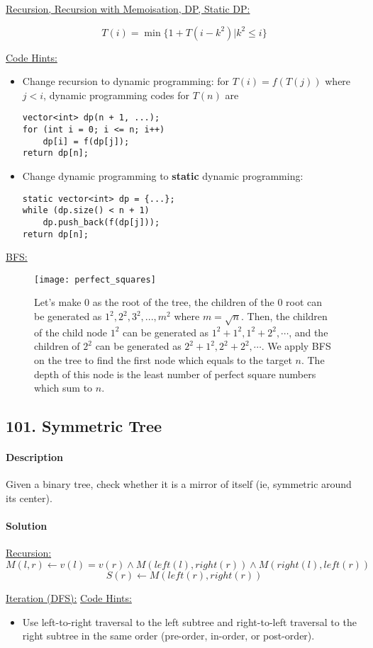 \underline{Recursion, Recursion with Memoisation, DP, Static DP:}

$$T(i)=\min\{1+T(i - k^2)|k^2\leqslant i\}$$

\underline{Code Hints:}
\begin{itemize}
    \item Change recursion to dynamic programming: for $T(i)=f(T(j))$ where $j < i$, dynamic programming codes for $T(n)$ are
\begin{verbatim}
vector<int> dp(n + 1, ...);
for (int i = 0; i <= n; i++)
    dp[i] = f(dp[j]);
return dp[n];
\end{verbatim}
    \item Change dynamic programming to \textbf{static} dynamic programming:
\begin{verbatim}
static vector<int> dp = {...};
while (dp.size() < n + 1)
    dp.push_back(f(dp[j]));
return dp[n];
\end{verbatim}
\end{itemize}

\underline{BFS:}
\begin{figure}[ht]
    \centering
    \texttt{[image: perfect\_squares]}
    \caption{Let's make $0$ as the root of the tree, the children of the $0$ root can be generated as $1^2,2^2,3^2,...,m^2$ where $m=\sqrt{n}$. Then, the children of the child node $1^2$ can be generated as $1^2+1^2,1^2+2^2,\cdots$, and the children of $2^2$ can be generated as $2^2+1^2,2^2+2^2,\cdots$. We apply BFS on the tree to find the first node which equals to the target $n$. The depth of this node is the least number of perfect square numbers which sum to $n$.}
    \label{fig:perfect_squares}
\end{figure}


\subsection{101. Symmetric Tree}

\paragraph{\color{white} \colorbox{Mahogany}{Description}}
Given a binary tree, check whether it is a mirror of itself (ie, symmetric around its center).

\paragraph{\color{white} \colorbox{OliveGreen}{Solution}}
\underline{Recursion:}
$$M(l, r)\gets v(l)=v(r)\wedge M(left(l), right(r))\wedge M(right(l), left(r))$$
$$S(r)\gets M(left(r), right(r))$$

\underline{Iteration (DFS):}
\underline{Code Hints:}
\begin{itemize}
    \item Use left-to-right traversal to the left subtree and right-to-left traversal to the right subtree in the same order (pre-order, in-order, or post-order).
\end{itemize}